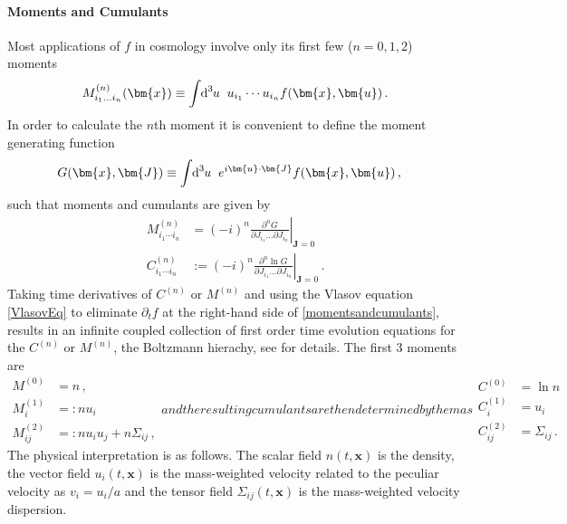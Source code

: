 \documentclass[twocolumn, nofootinbib, showpacs, superscriptaddress]{revtex4-1}
\newcommand{\del}[0]{\partial }
\newcommand{\vol}[2]{\hspace{-0.8mm}\mbox{$\text{d}^{\hspace{-0.0mm}#1}$}\hspace{-0.2mm}#2\hspace{0.8mm}\ }
\renewcommand{\v}[1]{\bm{#1} }
\newcommand{\vx}[0]{\bm{x} }
\newcommand{\vu}[0]{\bm{u} }
\begin{document}
\paragraph*{Moments and Cumulants}
Most applications of $f$ in cosmology involve only its first few ($n=0,1,2$) moments \begin{align}
M^{(n)}_{i_1 ... i_n}(\vx) \equiv \int \vol{3}{u}  u_{i_1} \cdots u_{i_n}  f(\vx,\vu) \,.
\end{align}
In order to calculate the $n$th moment it is convenient to define the moment generating function
\begin{align}
\label{genfun}
 G(\vx,\v{J}) &\equiv\int \vol{3}{u} e^{i\vu\cdot\v{J}}   f(\vx,\vu)\,,
\end{align}
such that moments and cumulants are given by
\begin{subequations} \label{momentsandcumulants}
\begin{align}
M^{(n)}_{i_1 \cdots i_n}&= (-i)^n \left.\frac{\del^n G}{\del J_{i_1} \ldots \del J_{i_n}} \right|_{\v{J}=0}  \label{moments}\\
C^{(n)}_{i_1 \cdots i_n}&:= (-i)^n \left.\frac{\del^n \ln G}{\del J_{i_1} \ldots \del J_{i_n}} \right|_{\v{J}=0} \label{cumulants}\,.
\end{align}
\end{subequations}
Taking time derivatives of $C^{(n)}$ or $M^{(n)}$ and using the Vlasov equation \eqref{VlasovEq} to eliminate $\partial_t f$ at the right-hand side of \eqref{momentsandcumulants}, results in an infinite coupled collection of first order time evolution equations for the $C^{(n)}$ or $M^{(n)}$, the Boltzmann hierachy, see \cite{UhlemannKoppHaugg2014} for details.
The first 3 moments are
\begin{subequations} \label{momentf}
\begin{align}
 M^{(0)} &=  n \label{0momentf} \,, \\
 M^{(1)}_i&=:  n  u_i \label{1momentf} \\
 M^{(2)}_{i j}&=:  n  u_i  u_j +   n  \Sigma_{ij} \label{2momentf}  \,,
\end{align}
and the resulting cumulants are then determined by them as
\begin{align}
C^{(0)} &= \ln  n \\
C^{(1)}_i &=  u_i \\
C^{(2)}_{ij} &=  \Sigma_{ij}\,. \label{2cumulantf} 
\end{align}
\end{subequations}
The physical interpretation is as follows. The scalar field $n(t,\vx)$ is the density, the vector field $u_i(t,\vx)$ is the mass-weighted 
velocity related to the peculiar velocity as $v_i = u_i/a$ and the tensor field $\Sigma_{ij}(t,\vx)$ is the mass-weighted velocity dispersion. 
\end{document}
